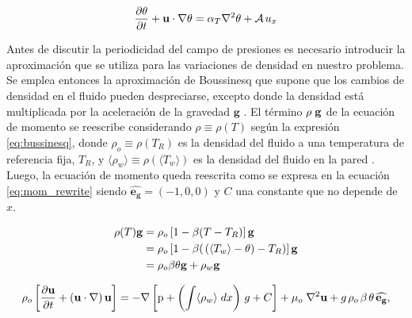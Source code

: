 \begin{equation}
\frac{ \partial \theta }{ \partial t } + \mathbf{u} \cdot \nabla \theta = \alpha_{T} \nabla^2 \theta + \mathcal{A} \hspace{0.5mm} u_x 
\label{eq:energy_pcb_source}
\end{equation}

Antes de discutir la periodicidad del campo de presiones es necesario introducir la aproximación que se utiliza para las variaciones de densidad en nuestro problema. Se emplea entonces la aproximación de Boussinesq que supone que los cambios de densidad en el fluido pueden despreciarse, excepto donde la densidad está multiplicada por la aceleración de la gravedad $\mathbf{g}$ \cite{kundu}. El término $\rho \hspace{1mm} \mathbf{g}$ de la ecuación de momento se reescribe considerando $\rho \equiv \rho(T)$ según la expresión \ref{eq:bussinesq}, donde $\rho_o \equiv \rho(T_R)$ es la densidad del fluido a una temperatura de referencia fija, $T_R$, y $ \langle \rho_w \rangle \equiv \rho(\langle T_w \rangle)$ es la densidad del fluido en la pared \cite{incropera}. Luego, la ecuación de momento queda reescrita como se expresa en la ecuación \ref{eq:mom_rewrite} siendo $\mathbf{\hat{e_g}}=(-1,0,0)$ y $C$ una constante que no depende de $x$.

\begin{equation}
\begin{aligned}
\rho(T) \mathbf{g} &= \rho_o \left[ 1 - \beta (T - T_R) \right] \mathbf{g} \\
				   &= \rho_o \left[ 1 - \beta ( \hspace{0.5mm} (\langle T_w \rangle - \theta) - T_R) \right] \mathbf{g} \\
 		           &= \rho_o \beta \theta \mathbf{g} + \rho_w \mathbf{g}
\end{aligned}
\label{eq:bussinesq}
\end{equation}

\begin{equation}
\rho_o \left[ \frac{ \partial  \mathbf{u}}{\partial t} + \left( \mathbf{u} \cdot \nabla \right)   \mathbf{u} \right] = -\nabla \left[ \text{p} + \left( \int \langle \rho_{w} \rangle \hspace{1mm} dx \right) \hspace{0.5mm} g + C \right] + \mu_o \hspace{1mm} {\nabla}^2 \mathbf{u}  + g \hspace{0.5mm} \rho_o \hspace{0.5mm} \beta \hspace{0.5mm} \theta \hspace{0.5mm} \mathbf{\widehat{e_g}},
\label{eq:mom_rewrite}  
\end{equation}

